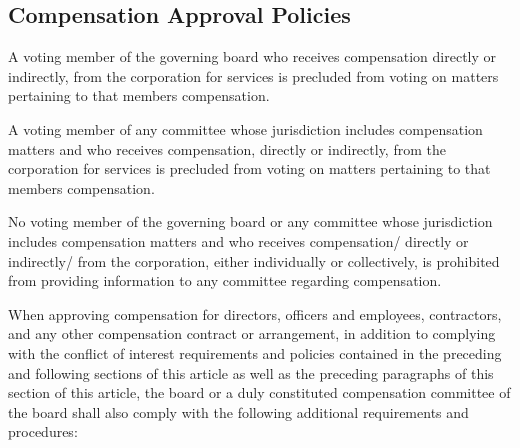 \documentclass{article}
\begin{document}
	\subsection{Compensation Approval Policies}
	A voting member of the governing board who receives compensation directly or indirectly, from the corporation for services is precluded from voting on matters pertaining to that member\textquotesingle s compensation.
	
	A voting member of any committee whose jurisdiction includes compensation matters and who receives compensation, directly or indirectly, from the corporation for services is precluded from voting on matters pertaining to that member\textquotesingle s compensation.
	
	No voting member of the governing board or any committee whose jurisdiction includes compensation matters and who receives compensation/ directly or indirectly/ from the corporation, either individually or collectively, is prohibited from providing information to any committee regarding compensation.
	
	When approving compensation for directors, officers and employees, contractors, and any other compensation contract or arrangement, in addition to complying with the conflict of interest requirements and policies contained in the preceding and following sections of this article as well as the preceding paragraphs of this section of this article, the board or a duly constituted compensation committee of the board shall also comply with the following additional requirements and procedures:
	
\end{document}

